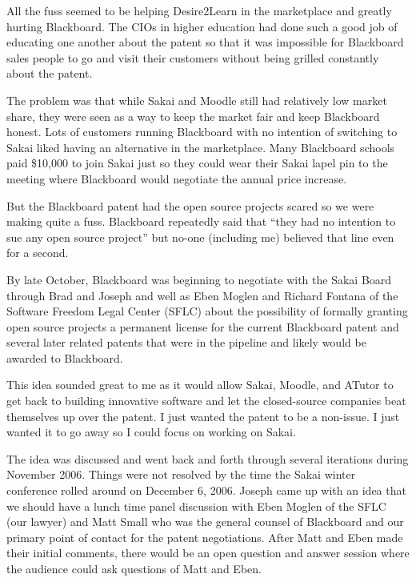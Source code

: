 \documentclass[12pt]{book}
\begin{document}
All the fuss seemed to be helping Desire2Learn in the marketplace
and greatly hurting Blackboard.  The CIOs in higher education
had done such a good job of educating one another about the patent
so that it was impossible for Blackboard sales people to go and visit
their customers without being grilled constantly about the patent.

The problem was that while Sakai and Moodle still had relatively
low market share, they were seen as a way to keep the market
fair and keep Blackboard honest.  Lots of customers running
Blackboard with no intention of switching to Sakai liked having
an alternative in the marketplace.  Many Blackboard schools
paid \$10,000 to join Sakai just so they could wear their
Sakai lapel pin to the meeting where Blackboard would negotiate
the annual price increase.

But the Blackboard patent had the open source projects scared
so we were making quite a fuss.  Blackboard repeatedly
said that ``they had no intention to sue any open source
project'' but no-one (including me) believed that line even
for a second.

By late October, Blackboard was beginning to negotiate with
the Sakai Board through Brad and Joseph and well as Eben
Moglen and Richard Fontana of the Software Freedom Legal Center
(SFLC) about the possibility of formally
granting open source projects a permanent license for the
current Blackboard patent and several later related patents
that were in the pipeline and likely would be awarded to
Blackboard.

This idea sounded great to me as it would allow Sakai, Moodle,
and ATutor to get back to building innovative software and
let the closed-source companies beat themselves up over
the patent. I just wanted the patent to be a non-issue.
I just wanted it to go away so I could focus on working
on Sakai.


The idea was discussed and went back and forth through several
iterations during November 2006.   Things were not resolved
by the time the Sakai winter conference rolled around on
December 6, 2006.  Joseph came up with an idea that we should
have a lunch time panel discussion with Eben Moglen of the
SFLC (our lawyer) and Matt Small who was the general counsel
of Blackboard and our primary point of contact for the patent
negotiations.  After Matt and Eben made their initial comments,
there would be an open question and answer session where the
audience could ask questions of Matt and Eben.
\end{document}

